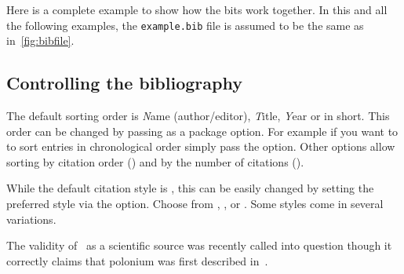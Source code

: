 Here is a complete example to show how the bits work together. In this and all the following examples, the \texttt{example.bib} file is assumed to be the same as in~\ref{fig:bibfile}.

\subsection{Controlling the bibliography}

The default sorting order is \emph{N}ame (author\slash{}editor), \emph{T}itle,
\emph{Y}ear or  in short. This order can be changed by passing
 as a package option. For example if you want to to sort
entries in chronological order simply pass the  option. Other options
allow sorting by citation order () and by the number of citations
().
\begin{example}[standalone,
  biber,
  biber_dir=../src/examples/,
  paperwidth=6.5cm,
  paperheight=5.5cm,
]
\usepackage[sorting=ynt]{biblatex}

\sloppy



\nocite{*}
\printbibliography[heading=none]

\end{example}

While the default citation style is , this can be easily changed by
setting the preferred style via the  option. Choose from
,
,  or . Some styles come in
several variations.
\begin{example}[standalone,
  biber,
  biber_dir=../src/examples/,
  paperwidth=6.5cm,
  paperheight=7.2cm,
]
\usepackage[
  style=alphabetic
]{biblatex}



\sloppy


\setlength{\parindent}{0pt} %
The validity of~\cite{dream} as a
scientific source was
recently called into question
though it correctly claims that
polonium was first described
in~\cite{curie}.
\printbibliography

\end{example}

